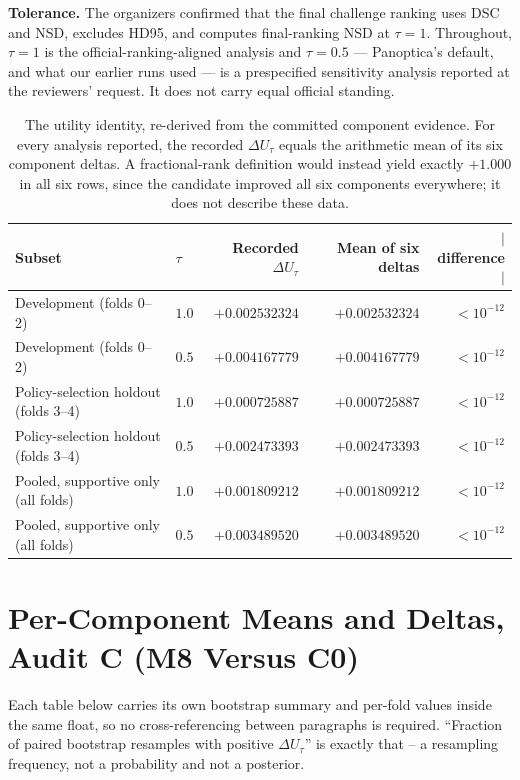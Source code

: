 \documentclass[runningheads]{llncs}
\begin{document}
\medskip\noindent\textbf{Tolerance.} The organizers confirmed that the final challenge ranking uses
DSC and NSD, excludes HD95, and computes final-ranking NSD at $\tau=1$. Throughout, $\tau=1$ is the
official-ranking-aligned analysis and $\tau=0.5$ --- Panoptica's default, and what our earlier runs
used --- is a prespecified sensitivity analysis reported at the reviewers' request. It does not
carry equal official standing.


\begin{table}[htbp]\centering
\caption{The utility identity, re-derived from the committed component evidence. For every analysis
reported, the recorded $\Delta U_\tau$ equals the arithmetic mean of its six component deltas. A
fractional-rank definition would instead yield exactly $+1.000$ in all six rows, since the candidate
improved all six components everywhere; it does not describe these data.}
\label{tab:identity}
\begin{tabular}{@{}llrrr@{}}
\toprule
Subset & $\tau$ & Recorded $\Delta U_\tau$ & Mean of six deltas & $|$difference$|$ \\
\midrule
Development (folds 0--2) & $1.0$ & $+0.002532324$ & $+0.002532324$ & $<10^{-12}$ \\
Development (folds 0--2) & $0.5$ & $+0.004167779$ & $+0.004167779$ & $<10^{-12}$ \\
Policy-selection holdout (folds 3--4) & $1.0$ & $+0.000725887$ & $+0.000725887$ & $<10^{-12}$ \\
Policy-selection holdout (folds 3--4) & $0.5$ & $+0.002473393$ & $+0.002473393$ & $<10^{-12}$ \\
Pooled, supportive only (all folds) & $1.0$ & $+0.001809212$ & $+0.001809212$ & $<10^{-12}$ \\
Pooled, supportive only (all folds) & $0.5$ & $+0.003489520$ & $+0.003489520$ & $<10^{-12}$ \\
\bottomrule
\end{tabular}
\end{table}

\section{Per-Component Means and Deltas, Audit C (M8 Versus C0)}

Each table below carries its own bootstrap summary and per-fold values inside the
same float, so no cross-referencing between paragraphs is required. ``Fraction of paired bootstrap
resamples with positive $\Delta U_\tau$'' is exactly that -- a resampling frequency, not a
probability and not a posterior.
\end{document}
